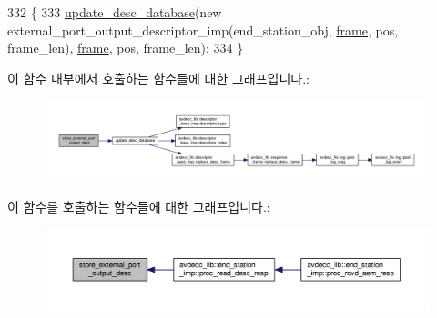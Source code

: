\begin{DoxyCode}
332 \{
333     \hyperlink{classavdecc__lib_1_1configuration__descriptor__imp_a98445251711b644b6da09d2354003778}{update\_desc\_database}(\textcolor{keyword}{new} external\_port\_output\_descriptor\_imp(end\_station\_obj, 
      \hyperlink{gst__avb__playbin_8c_ac8e710e0b5e994c0545d75d69868c6f0}{frame}, pos, frame\_len), \hyperlink{gst__avb__playbin_8c_ac8e710e0b5e994c0545d75d69868c6f0}{frame}, pos, frame\_len);
334 \}
\end{DoxyCode}


이 함수 내부에서 호출하는 함수들에 대한 그래프입니다.\+:
\nopagebreak
\begin{figure}[H]
\begin{center}
\leavevmode
\includegraphics[width=350pt]{classavdecc__lib_1_1configuration__descriptor__imp_a46bdcb3e0bbe17f2614a284001c88260_cgraph}
\end{center}
\end{figure}




이 함수를 호출하는 함수들에 대한 그래프입니다.\+:
\nopagebreak
\begin{figure}[H]
\begin{center}
\leavevmode
\includegraphics[width=350pt]{classavdecc__lib_1_1configuration__descriptor__imp_a46bdcb3e0bbe17f2614a284001c88260_icgraph}
\end{center}
\end{figure}


